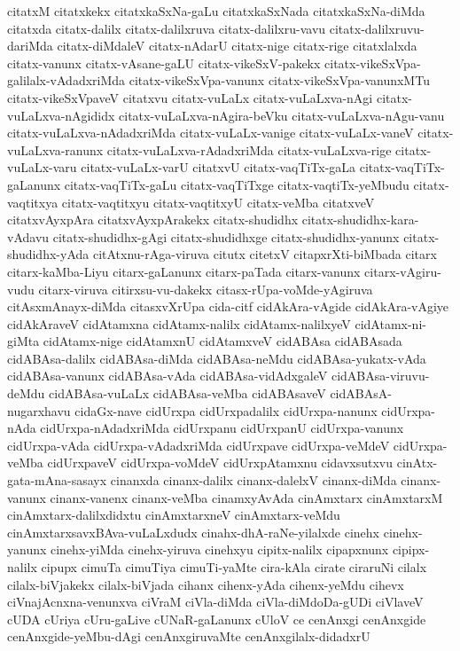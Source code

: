 {citatxM
citatxkekx
citatxkaSxNa-gaLu
citatxkaSxNada
citatxkaSxNa-diMda
citatxda
citatx-dalilx
citatx-dalilxruva
citatx-dalilxru-vavu
citatx-dalilxruvu-dariMda
citatx-diMdaleV
citatx-nAdarU
citatx-nige
citatx-rige
citatxlalxda
citatx-vanunx
citatx-vAsane-gaLU
citatx-vikeSxV-pakekx
citatx-vikeSxVpa-galilalx-vAdadxriMda
citatx-vikeSxVpa-vanunx
citatx-vikeSxVpa-vanunxMTu
citatx-vikeSxVpaveV
citatxvu
citatx-vuLaLx
citatx-vuLaLxva-nAgi
citatx-vuLaLxva-nAgididx
citatx-vuLaLxva-nAgira-beVku
citatx-vuLaLxva-nAgu-vanu
citatx-vuLaLxva-nAdadxriMda
citatx-vuLaLx-vanige
citatx-vuLaLx-vaneV
citatx-vuLaLxva-ranunx
citatx-vuLaLxva-rAdadxriMda
citatx-vuLaLxva-rige
citatx-vuLaLx-varu
citatx-vuLaLx-varU
citatxvU
citatx-vaqTiTx-gaLa
citatx-vaqTiTx-gaLanunx
citatx-vaqTiTx-gaLu
citatx-vaqTiTxge
citatx-vaqtiTx-yeMbudu
citatx-vaqtitxya
citatx-vaqtitxyu
citatx-vaqtitxyU
citatx-veMba
citatxveV
citatxvAyxpAra
citatxvAyxpArakekx
citatx-shudidhx
citatx-shudidhx-kara-vAdavu
citatx-shudidhx-gAgi
citatx-shudidhxge
citatx-shudidhx-yanunx
citatx-shudidhx-yAda
citAtxnu-rAga-viruva
citutx
citetxV
citapxrXti-biMbada
citarx
citarx-kaMba-Liyu
citarx-gaLanunx
citarx-paTada
citarx-vanunx
citarx-vAgiru-vudu
citarx-viruva
citirxsu-vu-dakekx
citasx-rUpa-voMde-yAgiruva
citAsxmAnayx-diMda
citasxvXrUpa
cida-citf
cidAkAra-vAgide
cidAkAra-vAgiye
cidAkAraveV
cidAtamxna
cidAtamx-nalilx
cidAtamx-nalilxyeV
cidAtamx-ni-giMta
cidAtamx-nige
cidAtamxnU
cidAtamxveV
cidABAsa
cidABAsada
cidABAsa-dalilx
cidABAsa-diMda
cidABAsa-neMdu
cidABAsa-yukatx-vAda
cidABAsa-vanunx
cidABAsa-vAda
cidABAsa-vidAdxgaleV
cidABAsa-viruvu-deMdu
cidABAsa-vuLaLx
cidABAsa-veMba
cidABAsaveV
cidABAsA-nugarxhavu
cidaGx-nave
cidUrxpa
cidUrxpadalilx
cidUrxpa-nanunx
cidUrxpa-nAda
cidUrxpa-nAdadxriMda
cidUrxpanu
cidUrxpanU
cidUrxpa-vanunx
cidUrxpa-vAda
cidUrxpa-vAdadxriMda
cidUrxpave
cidUrxpa-veMdeV
cidUrxpa-veMba
cidUrxpaveV
cidUrxpa-voMdeV
cidUrxpAtamxnu
cidavxsutxvu
cinAtx-gata-mAna-sasayx
cinanxda
cinanx-dalilx
cinanx-dalelxV
cinanx-diMda
cinanx-vanunx
cinanx-vanenx
cinanx-veMba
cinamxyAvAda
cinAmxtarx
cinAmxtarxM
cinAmxtarx-dalilxdidxtu
cinAmxtarxneV
cinAmxtarx-veMdu
cinAmxtarxsavxBAva-vuLaLxdudx
cinahx-dhA-raNe-yilalxde
cinehx
cinehx-yanunx
cinehx-yiMda
cinehx-yiruva
cinehxyu
cipitx-nalilx
cipapxnunx
cipipx-nalilx
cipupx
cimuTa
cimuTiya
cimuTi-yaMte
cira-kAla
cirate
ciraruNi
cilalx
cilalx-biVjakekx
cilalx-biVjada
cihanx
cihenx-yAda
cihenx-yeMdu
cihevx
ciVnajAcnxna-venunxva
ciVraM
ciVla-diMda
ciVla-diMdoDa-gUDi
ciVlaveV
cUDA
cUriya
cUru-gaLive
cUNaR-gaLanunx
cUloV
ce
cenAnxgi
cenAnxgide
cenAnxgide-yeMbu-dAgi
cenAnxgiruvaMte
cenAnxgilalx-didadxrU
}

